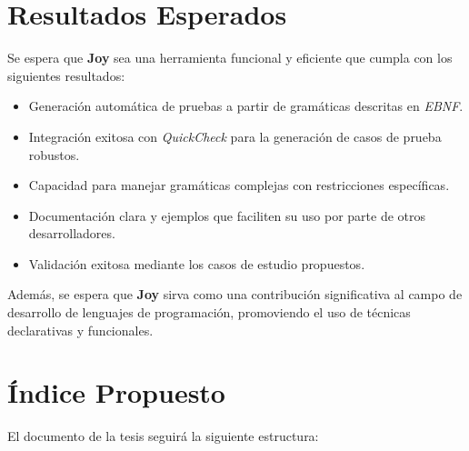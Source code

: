 \documentclass[12pt]{article}
\begin{document}
\section*{Resultados Esperados}

Se espera que \textbf{Joy} sea una herramienta funcional y eficiente que cumpla con los siguientes resultados:

\begin{itemize}
\item Generación automática de pruebas a partir de gramáticas descritas en \textit{EBNF}.
\item Integración exitosa con \textit{QuickCheck} para la generación de casos de prueba robustos.
\item Capacidad para manejar gramáticas complejas con restricciones específicas.
\item Documentación clara y ejemplos que faciliten su uso por parte de otros desarrolladores.
\item Validación exitosa mediante los casos de estudio propuestos.
\end{itemize}

Además, se espera que \textbf{Joy} sirva como una contribución significativa al campo de desarrollo de lenguajes de programación, promoviendo el uso de técnicas declarativas y funcionales.

\section*{Índice Propuesto}

El documento de la tesis seguirá la siguiente estructura:
\end{document}

